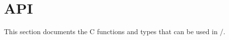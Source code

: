 \section{API}

This section documents the C functions and types that can be used in \ANLOpenCL/.






